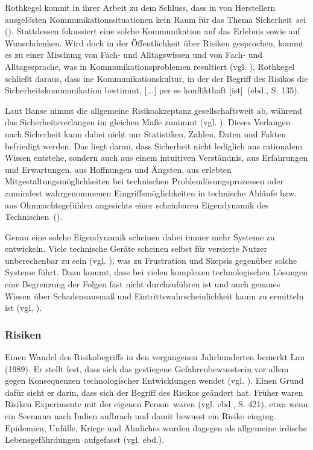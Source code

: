 Rothkegel kommt in ihrer Arbeit zu dem Schluss, dass in von Herstellern ausgelösten Kommunikationssituationen \glqq kein Raum für das Thema Sicherheit\grqq \, sei (\cite[132]{rothkegel2013sicherheitskommunikation}). Stattdessen fokussiert eine solche Kommunikation auf das Erlebnis sowie auf Wunschdenken. Wird doch in der Öffentlichkeit über Risiken gesprochen, kommt es zu einer Mischung von Fach- und Alltagswissen und von Fach- und Alltagssprache, was in Kommunikationsproblemen resultiert (vgl. \cite[134]{rothkegel2013sicherheitskommunikation}). Rothkegel schließt daraus, dass \glqq [e]ine Kommunikationskultur, in der der Begriff des Risikos die Sicherheitskommunikation bestimmt, [...] per se konflikthaft [ist]\grqq \, (ebd., S. 135).

Laut Banse nimmt die allgemeine Risikoakzeptanz gesellschaftsweit ab, während das Sicherheitsverlangen im gleichen Maße zunimmt (vgl. \cite[3]{banse2018technik}). Dieses Verlangen nach Sicherheit kann dabei nicht nur Statistiken, Zahlen, Daten und Fakten befriedigt werden. Das liegt daran, dass Sicherheit nicht lediglich aus rationalem Wissen entstehe, sondern auch aus \glqq einem intuitiven Verständnis, aus Erfahrungen und Erwartungen, aus Hoffnungen und Ängsten, aus erlebten Mitgestaltungsmöglichkeiten bei technischen Problemlösungsprozessen oder zumindest wahrgenommenen Eingriffsmöglichkeiten in technische Abläufe bzw. aus Ohnmachtsgefühlen angesichts einer scheinbaren Eigendynamik des Technischen\grqq \, (\cite[4]{banse2018technik}).

Genau eine solche Eigendynamik scheinen dabei immer mehr Systeme zu entwickeln. Viele technische Geräte scheinen selbst für versierte Nutzer unberechenbar zu sein (vgl. \cite[5]{norman2013design}), was zu Frustration und Skepsis gegenüber solche Systeme führt. Dazu kommt, dass bei vielen komplexen technologischen Lösungen eine Begrenzung der Folgen fast nicht durchzuführen ist und auch genaues Wissen über Schadensausmaß und Eintrittswahrscheinlichkeit kaum zu ermitteln ist (vgl. \cite[12]{banse2018technik}).

\subsubsection*{Risiken}

Einen Wandel des Risikobegriffs in den vergangenen Jahrhunderten bemerkt Lau (1989). Er stellt fest, dass sich das gestiegene Gefahrenbewusstsein vor allem gegen Konsequenzen technologischer Entwicklungen wendet (vgl. \cite[418]{lau1989risikodiskurse}). Einen Grund dafür sieht er darin, dass sich der Begriff des Risikos geändert hat. Früher waren Risiken \glqq Experimente mit der eigenen Person\grqq \, waren (vgl. ebd., S. 421), etwa wenn ein Seemann nach Indien aufbrach und damit bewusst ein Risiko einging. Epidemien, Unfälle, Kriege und Ähnliches wurden dagegen als \glqq allgemeine irdische Lebensgefährdungen\grqq \, aufgefasst (vgl. ebd.).

